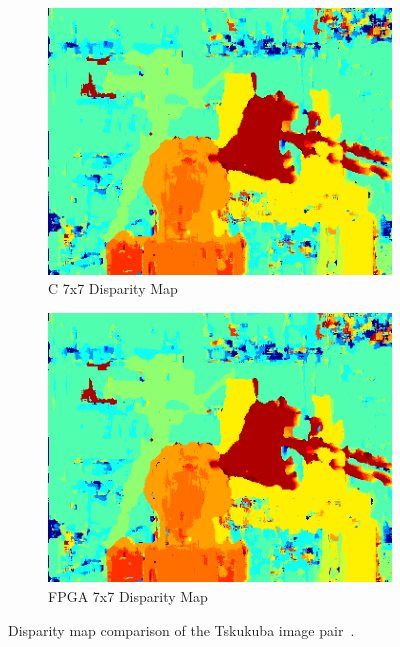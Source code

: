 \begin{figure}
\begin{center}
	\\
	\begin{subfigure}{0.45\textwidth}
		\includegraphics[width=\textwidth]{figures/tsukuba_c_7x7.png}
		\caption{C 7x7 Disparity Map}
		\label{fig:tsukubaC7x7}
	\end{subfigure}
	\begin{subfigure}{0.45\textwidth}
		\includegraphics[width=\textwidth]{figures/tsukuba_buffer_7x7_4.png}
		\caption{FPGA 7x7 Disparity Map}
		\label{fig:tsukubaFPGA7x7}
	\end{subfigure}
	\captionfonts
	\caption{Disparity map comparison of the Tskukuba image pair~\cite{middlebury}.}
	\label{fig:tsukubaDispMap}
\end{center}
\end{figure}

